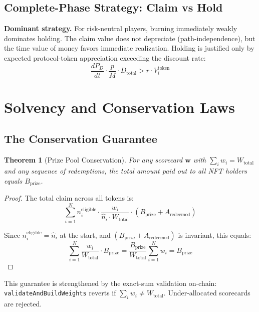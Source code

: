 \documentclass[11pt,a4paper]{article}
\newtheorem{theorem}{Theorem}
\begin{document}
\subsection{Complete-Phase Strategy: Claim vs Hold}

\textbf{Dominant strategy.} For risk-neutral players, burning immediately weakly dominates holding. The claim value does not depreciate (path-independence), but the time value of money favors immediate realization. Holding is justified only by expected protocol-token appreciation exceeding the discount rate:
\begin{equation}
\frac{dP_D}{dt} \cdot \frac{p}{M} \cdot D_{\text{total}} > r \cdot V_i^{\text{token}}
\end{equation}

\section{Solvency and Conservation Laws}

\subsection{The Conservation Guarantee}

\begin{theorem}[Prize Pool Conservation]
For any scorecard $\mathbf{w}$ with $\sum_i w_i = W_{\text{total}}$ and any sequence of redemptions, the total amount paid out to all NFT holders equals $B_{\text{prize}}$.
\end{theorem}

\begin{proof}
The total claim across all tokens is:
$$\sum_{i=1}^{N} n_i^{\text{eligible}} \cdot \frac{w_i}{\hat{n}_i \cdot W_{\text{total}}} \cdot (B_{\text{prize}} + A_{\text{redeemed}})$$

Since $n_i^{\text{eligible}} = \hat{n}_i$ at the start, and $(B_{\text{prize}} + A_{\text{redeemed}})$ is invariant, this equals:
$$\sum_{i=1}^{N} \frac{w_i}{W_{\text{total}}} \cdot B_{\text{prize}} = \frac{B_{\text{prize}}}{W_{\text{total}}} \sum_{i=1}^{N} w_i = B_{\text{prize}}$$
\end{proof}

This guarantee is strengthened by the exact-sum validation on-chain:
\texttt{validate\-And\-Build\-Weights} reverts if $\sum_i w_i \neq W_{\text{total}}$.
Under-allocated scorecards are rejected.
\end{document}
